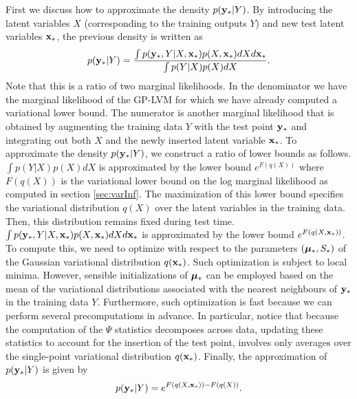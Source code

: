 \documentclass[twoside,times]{article}
\begin{document}
First we discuss how to approximate the density $p(\mathbf{y}_* |
Y)$.  By introducing the latent variables $X$ (corresponding to the
training outputs $Y$) and new test latent variables $\mathbf{x}_*$, the
previous  density is written as 
\begin{equation}
p(\mathbf{y}_{*} |Y) = 
\frac{\int p(\mathbf{y}_*,Y | X, \mathbf{x}_*) p(X,\mathbf{x}_*) d X d \mathbf{x}_* }
{\int p(Y | X) p(X) d X}. 
\label{eq:predictedDensity}
\end{equation}
Note that this is a ratio of two marginal likelihoods. In the denominator 
we have the marginal likelihood of the GP-LVM for which we have already
computed a variational lower bound.  The numerator is another 
marginal likelihood that is obtained by augmenting the training data
$Y$ with the test point $\mathbf{y}_*$ and integrating out both $X$ and the 
newly inserted latent variable $\mathbf{x}_*$. To approximate the density 
 $p(\mathbf{y}_* |Y)$, we construct a ratio of lower bounds as follows. 
$ \int p(Y | X) p(X) d X $ is approximated by the lower bound $e^{F(q(X))}$ where 
$F(q(X))$ is the variational lower bound on the log marginal
likelihood as computed in section \ref{sec:varInf}. The maximization   
of this lower bound  specifies the variational
distribution $q(X)$ over the latent variables in the training
data. Then, this distribution  remains fixed during test time.     
$\int p(\mathbf{y}_*,Y | X, \mathbf{x}_*) p(X,\mathbf{x}_*) d X d \mathbf{x}_*$ 
is approximated by the lower bound $e^{F(q(X,\mathbf{x}_*))}$. 
To compute this, 
we need to optimize with respect to
the parameters $(\bm{\mu}_*, S_*)$ of the Gaussian variational distribution 
$q(\mathbf{x}_*)$. Such optimization is subject to local minima. However, 
sensible initializations of $\bm{\mu}_*$ can be employed based on the 
mean of the variational distributions associated with the nearest
neighbours of $\mathbf{y}_*$ in the training data $Y$. 
Furthermore, such optimization is fast because we can perform  
several precomputations in advance. In particular, 
notice that because the computation of the
$\Psi$ statistics decomposes across data, updating 
these statistics  to account for the 
insertion of the test point, involves only averages over the single-point 
variational distribution $q(\mathbf{x}_*)$. Finally, the approximation 
of $p(\mathbf{y}_* |Y)$ is given by 
\begin{equation}
p(\mathbf{y}_* |Y) = e^{ F(q(X,\mathbf{x}_*)) - F(q(X))  }. 
\label{eq:ApproxpredictedDensity}
\end{equation}
\end{document}
